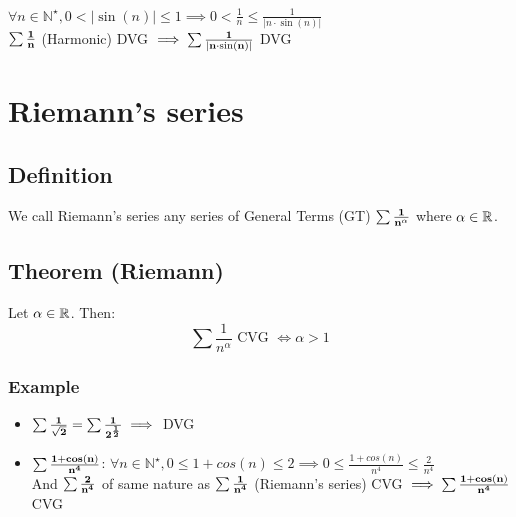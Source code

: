 \documentclass[notitlepage]{math}
\begin{document}
\noindent $\forall n \in \mathbb{N}^\star, 0 < \lvert \sin(n) \rvert \leq 1 \implies 0 < \frac{1}{n} \leq \frac{1}{\lvert n \cdot \sin(n) \rvert}$\\
$\bf \sum \frac{1}{n}$ (Harmonic) DVG $\implies \bf \sum \frac{1}{\lvert n \cdot \sin(n) \rvert}$ DVG

\section{Riemann's series}
\subsection{Definition}
We call Riemann's series any series of General Terms (GT) $\bf \sum \frac{1}{n^\alpha}$ where $\bf \alpha \in \mathbb{R}$.\\
\subsection{Theorem (Riemann)}
Let $\bf \alpha \in \mathbb{R}$. Then:
\[ \sum \frac{1}{n^\alpha} \text{ CVG } \Longleftrightarrow \alpha > 1 \]
\subsubsection{Example}
\begin{itemize}
    \item $\bf \sum \frac{1}{\sqrt{2}} = \sum \frac{1}{2^{\frac{1}{2}}} \implies$ DVG 
    \item $\bf \sum \frac{1 + cos(n)}{n^4}$: $\forall n \in \mathbb{N}^\star, 0 \leq 1 + cos(n) \leq 2 \implies 0 \leq \frac{1 + cos(n)}{n^4} \leq \frac{2}{n^4}$\\
    And $\bf \sum \frac{2}{n^4}$ of same nature as $\bf \sum \frac{1}{n^4}$ (Riemann's series) CVG $\implies \bf \sum \frac{1 + cos(n)}{n^4}$ CVG
\end{itemize}
\end{document}
